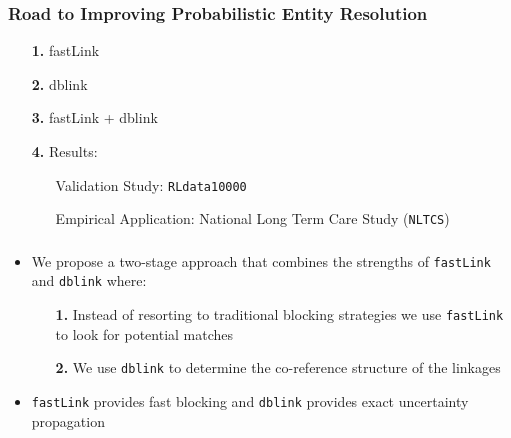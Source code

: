\documentclass[9pt]{beamer}
\begin{document}
\begin{frame}[plain]
\frametitle{Road to Improving Probabilistic Entity Resolution}

\begin{itemize}
\item[{\color{orange!30} \bf 1.}] {\color{black!30} fastLink}
\vfill
\item[{\color{orange!30} \bf 2.}] {\color{black!30} dblink}
\vfill
\item[{\color{orange} \bf 3.}] {\color{black} fastLink + dblink }
\vfill
\item[{\color{orange!30} \bf 4.}] {\color{black!30} Results: }
\vfill
\begin{itemize}
\item[\TedBB] {\color{black!30} Validation Study: \texttt{RLdata10000} } \vfill
\item[\TedBB] {\color{black!30} Empirical Application: National Long Term Care Study (\texttt{NLTCS})}
\end{itemize}
\vfill
\end{itemize}
\end{frame}

\addtocounter{framenumber}{-1}



\begin{frame}
\frametitle{\fLdb}

\begin{itemize}
\item We propose a two-stage approach that combines the strengths of \texttt{fastLink} and \texttt{dblink} where:
\vfill
\begin{itemize}
\item[{\color{orange} \bf 1.}]  Instead of resorting to traditional blocking strategies we use \texttt{fastLink} to look for potential matches
\vfill
\item[{\color{orange} \bf 2.}]  We use \texttt{dblink} to determine the co-reference structure of the linkages
\vfill
\end{itemize}
\item \texttt{fastLink} provides fast blocking and \texttt{dblink} provides exact uncertainty propagation
\end{itemize}
\end{frame}
\end{document}
